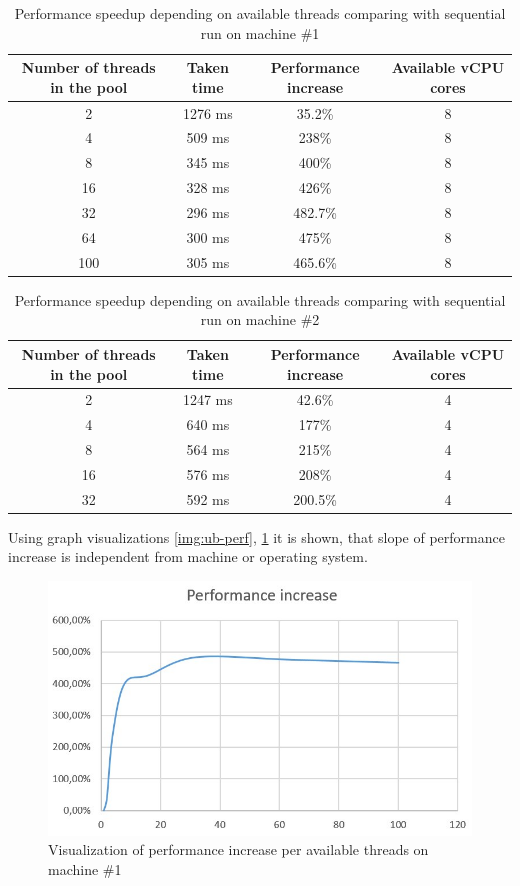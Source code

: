 \begin{table}[H]
\centering\caption{Performance speedup depending on available threads comparing with sequential run on machine \#1 \label{tab:comp-windows}}
\begin{tabular}{|c|c|c|c|}
\hline
\textbf{Number of threads in the pool} & \textbf{Taken time} & \textbf{Performance increase} & Available vCPU cores \\
\hline
2 & 1276 ms & 35.2\% & 8 \\
\hline
4 & 509 ms & 238\% & 8  \\
\hline
8 & 345 ms & 400\% & 8 \\
\hline
16 & 328 ms & 426\% & 8 \\
\hline
32 & 296 ms & 482.7\% & 8 \\
\hline
64 & 300 ms & 475\% & 8 \\
\hline
100 & 305 ms & 465.6\% & 8 \\
\hline
\end{tabular}
\end{table}

\begin{table}[h]
\centering\caption{Performance speedup depending on available threads comparing with sequential run on machine \#2 \label{tab:comp-ubuntu}}
\begin{tabular}{|c|c|c|c|}
\hline
\textbf{Number of threads in the pool} & \textbf{Taken time} & \textbf{Performance increase} & Available vCPU cores \\
\hline
 2 & 1247 ms & 42.6\% & 4 \\
\hline
 4 & 640 ms & 177\% & 4 \\
\hline
 8 & 564 ms & 215\% & 4 \\
\hline
 16 & 576 ms & 208\% & 4 \\
\hline
 32 & 592 ms & 200.5\% & 4 \\
\hline
\end{tabular}
\end{table}

Using graph visualizations \ref{img:ub-perf}, \ref{img:win-perf} it is shown, that slope of performance increase is independent from machine or operating system. 

\begin{figure}[H]
\centering\includegraphics[width=.8\textwidth]{img/exp/2/windows-performance-increase}
\caption{Visualization of performance increase per available threads on machine \#1}  \label{img:win-perf}
\end{figure}

